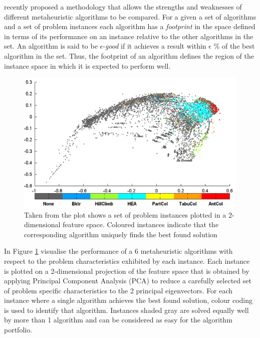\documentclass[a4paper]{article}
\begin{document}
\cite{SmithMiles2014} recently proposed a methodology that allows the strengths and weaknesses of different metaheuristic algorithms to be compared.
For a given a set of algorithms and a set of problem instances each algorithm has a {\em footprint} in the space defined in terms of its performance on an instance relative
to the other algorithms in the set. An algorithm is said to be
$\epsilon$-{\em good} if it achieves a result within $\epsilon$ \% of
the best algorithm in the set. Thus, the footprint of an algorithm
defines the region of the instance space in which it is expected to
perform well.


\begin{figure}
\centering
\includegraphics[width=1.0\textwidth]{img/smithBest}
\caption{\label{img:smithBest} Taken from \cite{SmithMiles2014} the plot shows a set of problem instances plotted in a 2-dimensional feature space. Coloured instances indicate that the corresponding algorithm uniquely finds the best found solution}
\end{figure} 

In Figure \ref{img:smithBest} \cite{SmithMiles2014} visualise the performance of a 6 metaheuristic algorithms with respect to the problem characteristics exhibited by each instance.
Each instance is plotted on a 2-dimensional projection of the feature space that is obtained by applying Principal Component Analysis (PCA) to reduce a carefully selected set of problem specific characteristics to the 2 principal eigenvectors.
For each instance where a single algorithm achieves the best found solution, colour coding is used to identify that algorithm. Instances shaded gray are solved equally well by more than 1 algorithm and can be considered as easy for the algorithm portfolio.
\end{document}
